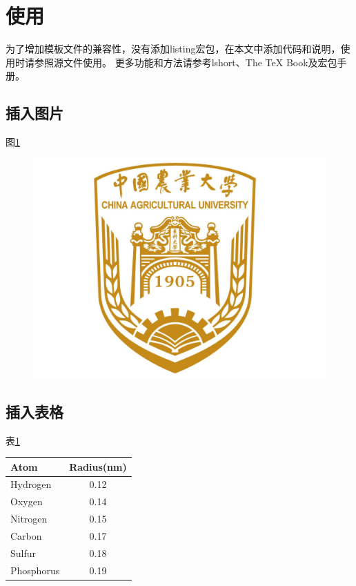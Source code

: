 \documentclass[twoside,maketable]{cauthesis}
\begin{document}
    \section{使用}
    为了增加模板文件的兼容性，没有添加listing宏包，在本文中添加代码和说明，使用时请参照源文件使用。
    更多功能和方法请参考lshort、The TeX Book及宏包手册。

    \subsection{插入图片}
    图\ref{fig:1}%
    \begin{figure}[H]
        \centering
        \includegraphics{./Picture/Logo.jpg}
        \label{fig:1}%
    \end{figure}

    \subsection{插入表格}
    表\ref{tab:1}%
    \begin{table}[H]
        \centering
        \begin{tabular}{lc}
            \hline
            Atom&Radius(nm)\\
            \hline
            Hydrogen&0.12\\
            Oxygen&0.14\\
            Nitrogen&0.15\\
            Carbon&0.17\\
            Sulfur&0.18\\
            Phosphorus&0.19\\
            \hline
        \end{tabular}
        \label{tab:1}%
    \end{table}
\end{document}
